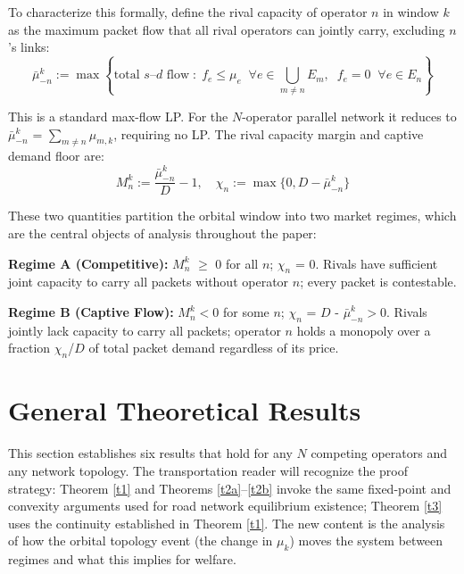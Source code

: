 \documentclass[review,3p,authoryear]{elsarticle}
\begin{document}
To characterize this formally, define the rival capacity of operator $n$ in window $k$ as the maximum packet flow that all rival operators can jointly carry, excluding $n$'s links:
\begin{equation}
    \bar{{\mu}}_{-n}^{k} := \max\left\{ \text{total } s\text{--}d \text{ flow} \;:\; f_e \le {\mu}_e \;\; \forall e \in \bigcup_{m \ne n} E_m, \;\; f_e = 0 \;\; \forall e \in E_n \right\}
\end{equation}

This is a standard max-flow LP. For the $N$-operator parallel network it reduces to $\ensuremath{\bar{{\mu}}}_{-n}^{k}$ = $\sum_{m {\ne} n} {\mu}_{m,k}$, requiring no LP. The rival capacity margin and captive demand floor are:
\begin{equation}
    M_{n}^{k} := \frac{\ensuremath{\bar{{\mu}}}_{-n}^{k}}{D} - 1, \quad {\chi}_{n} := \max\{0, D - \ensuremath{\bar{{\mu}}}_{-n}^{k}\}
\end{equation}

These two quantities partition the orbital window into two market regimes, which are the central objects of analysis throughout the paper:

\textbf{Regime A (Competitive):} $M_{n}^{k}$ \ensuremath{\ge} 0 for all $n$; ${\chi}_{n}$ = 0. Rivals have sufficient joint capacity to carry all packets without operator $n$; every packet is contestable.

\textbf{Regime B (Captive Flow):} $M_{n}^{k} < 0$ for some $n$; ${\chi}_{n}$ = $D$ - $\ensuremath{\bar{{\mu}}}_{-n}^{k} > 0$. Rivals jointly lack capacity to carry all packets; operator $n$ holds a monopoly over a fraction ${\chi}_{n}$/$D$ of total packet demand regardless of its price.

\section{General Theoretical Results}
\label{sec3}

This section establishes six results that hold for any $N$ competing operators and any network topology. The transportation reader will recognize the proof strategy: Theorem \ref{t1} and Theorems \ref{t2a}--\ref{t2b} invoke the same fixed-point and convexity arguments used for road network equilibrium existence; Theorem \ref{t3} uses the continuity established in Theorem \ref{t1}. The new content is the analysis of how the orbital topology event (the change in ${\mu}_{k}$) moves the system between regimes and what this implies for welfare.
\end{document}
